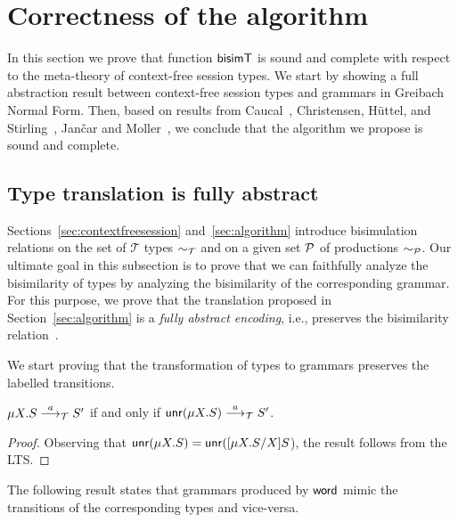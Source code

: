 \section{Correctness of the algorithm}
\label{sec:correctness}

In this section we prove that function $\BisimT$ is sound and complete
with respect to the meta-theory of context-free session types.
%
We start by showing a full abstraction result between context-free
session types and grammars in Greibach Normal Form.
%
Then, based on results from Caucal~\cite{caucal1986decidabilite},
Christensen, H{\"{u}}ttel, and
Stirling~\cite{DBLP:journals/iandc/ChristensenHS95}, Jan{\v{c}}ar and
Moller~\cite{janvcar1999techniques}, we conclude that the algorithm 
we propose is sound and complete.

\subsection{Type translation is fully abstract}

Sections~\ref{sec:contextfreesession} and~\ref{sec:algorithm}
introduce bisimulation relations on the set of $\mathcal T$ types
$\TypeEquiv$ and on a given set $\productions$ of productions
$\ProdEquiv$.  Our ultimate goal in this subsection is to prove that
we can faithfully analyze the bisimilarity of types by analyzing the
bisimilarity of the corresponding grammar. For this purpose, we prove
that the translation proposed in Section~\ref{sec:algorithm} is a
\emph{fully abstract encoding}, i.e., preserves the bisimilarity
relation~\cite{gorla2016full}.

We start proving that the transformation of types to grammars preserves
the labelled transitions.

\begin{lemma}
  \label{lemma:unravelling}
  $\mu X. S \LTSderives[a] S'$ if and only if
  $\Unravel (\mu X. S) \LTSderives[a] S'$.
\end{lemma}
%
\begin{proof}
  Observing that
  $\Unravel(\mu X. S) = \Unravel(\subs{\mu X.S}{X}{S}$), the result
  follows from the LTS.
\end{proof}

The following result states that grammars produced by
$\word$ mimic the transitions of the corresponding types
and vice-versa.

